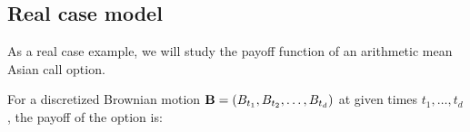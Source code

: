 %
%
%
%
%



\subsection{Real case model}
\label{sec:5.2}
As a real case example, we will study the payoff function of an arithmetic mean Asian call option.

For a discretized Brownian motion $\boldsymbol{\mathbf{B}}=(B_{t_1}, B_{t_2},\dots, B_{t_d})$ at given times $t_1,\dots,t_d$, the payoff of the option is:

